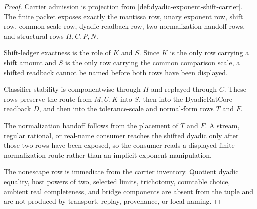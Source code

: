 \begin{proof}
Carrier admission is projection from \autoref{def:dyadic-exponent-shift-carrier}. The finite packet exposes exactly the mantissa row, unary exponent row, shift row, common-scale row, dyadic readback row, two normalization handoff rows, and structural rows $H,C,P,N$.

Shift-ledger exactness is the role of $K$ and $S$. Since $K$ is the only row carrying a shift amount and $S$ is the only row carrying the common comparison scale, a shifted readback cannot be named before both rows have been displayed.

Classifier stability is componentwise through $H$ and replayed through $C$. These rows preserve the route from $M,U,K$ into $S$, then into the DyadicRatCore readback $D$, and then into the tolerance-scale and normal-form rows $T$ and $F$.

The normalization handoff follows from the placement of $T$ and $F$. A stream, regular rational, or real-name consumer reaches the shifted dyadic only after those two rows have been exposed, so the consumer reads a displayed finite normalization route rather than an implicit exponent manipulation.

The nonescape row is immediate from the carrier inventory. Quotient dyadic equality, host powers of two, selected limits, trichotomy, countable choice, ambient real completeness, and bridge components are absent from the tuple and are not produced by transport, replay, provenance, or local naming.
\end{proof}

